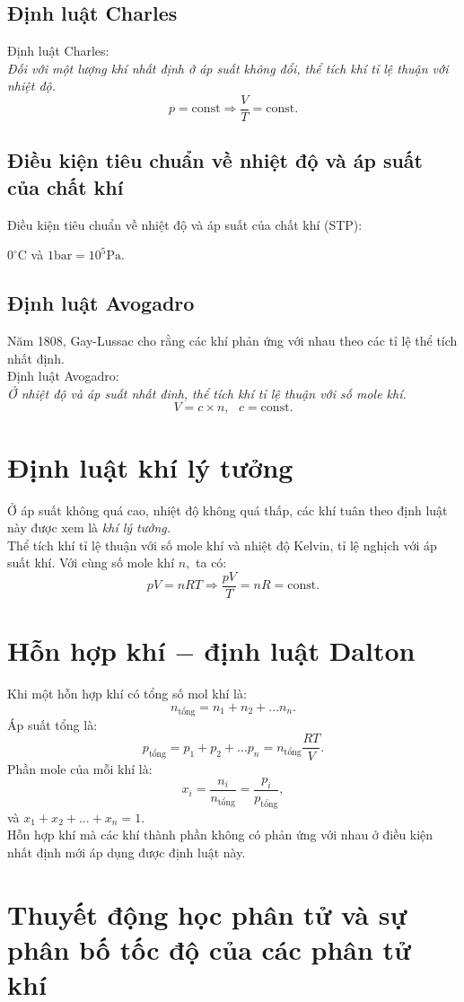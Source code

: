 \subsection{Định luật Charles}
Định luật Charles:\\
\textit{Đối với một lượng khí nhất định ở áp suất không đổi, thể tích khí tỉ lệ thuận với nhiệt độ.}
$$p = \mathrm{const} \Rightarrow \frac{V}{T} = \mathrm{const}.$$
\subsection{Điều kiện tiêu chuẩn về nhiệt độ và áp suất của chất khí}
Điều kiện tiêu chuẩn về nhiệt độ và áp suất của chất khí (STP): \\
\centerline{$0 ^ \circ \mathrm{C}$ và $1 \mathrm{bar} = 10^5 \mathrm{Pa}.$}
\subsection{Định luật Avogadro}
Năm 1808, Gay-Lussac cho rằng các khí phản ứng với nhau theo các tỉ lệ thể tích nhất định.\\
Định luật Avogadro:\\
\textit{Ở nhiệt độ và áp suất nhất đinh, thể tích khí tỉ lệ thuận với số mole khí.}
$$V = c \times n, \text{ } c = \mathrm{const}.$$
\section{Định luật khí lý tưởng}
Ở áp suất không quá cao, nhiệt độ không quá thấp, các khí tuân theo định luật này được xem là \textit{khí lý tưởng.}\\
Thể tích khí tỉ lệ thuận với số mole khí và nhiệt độ Kelvin, tỉ lệ nghịch với áp suất khí.
Với cùng số mole khí $n,$ ta có:
$$pV = nRT \Rightarrow \frac{pV}{T} = nR = \mathrm{const}.$$
\section{Hỗn hợp khí $-$ định luật Dalton}
Khi một hỗn hợp khí có tổng số mol khí là:
$$n_{\text{tổng}} = n_1 + n_2 + ... n_n.$$
Áp suất tổng là:
$$p_{\text{tổng}} = p_1 + p_2 + ... p_n = n_{\text{tổng}} \frac{RT}{V}.$$
Phần mole của mỗi khí là:
$$x_i = \frac{n_i}{n_{\text{tổng}}} = \frac{p_i}{p_{\text{tổng}}},$$
và $x_1 + x_2 + ... + x_n = 1.$\\
Hỗn hợp khí mà các khí thành phần không có phản ứng với nhau ở điều kiện nhất định mới áp dụng được định luật này.
\section{Thuyết động học phân tử và sự phân bố tốc độ của các phân tử khí}

